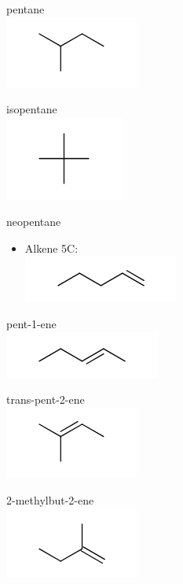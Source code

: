 \documentclass[10pt]{article}
\begin{document}
pentane\\
\includegraphics{smile-c5590549eecd6142e008f1d09b9644bf1f1b423f}

isopentane\\
\includegraphics{smile-aa44cf304737f87d7eed2ebd03183d4ffa21f075}

neopentane

\begin{itemize}
  \item Alkene 5C:\\
\includegraphics{smile-d4cbd49d128915922ac6eeb2b3eee303e2e8448c}
\end{itemize}

pent-1-ene\\
\includegraphics{smile-fb05e63fafd14643155c4e815f3857d2c0211381}

trans-pent-2-ene\\
\includegraphics{smile-08058f48ee85152196c907e44768c7ea10784b6f}

2-methylbut-2-ene\\
\includegraphics{smile-1f20a45801cc60f31affcb92093831d0deb8ab46}
\end{document}
